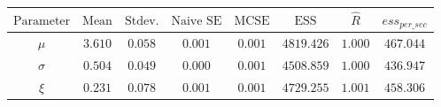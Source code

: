 \begin{tabular}{cccccccc}
\toprule
$\textrm{Parameter}$ & $\textrm{Mean}$ & $\textrm{Stdev.}$ & $\textrm{Naive SE}$ & $\textrm{MCSE}$ & $\textrm{ESS}$ & $\hat{R}$ & $ess_{per\_sec}$\\
\midrule
$\mu$ & $3.610$ & $0.058$ & $0.001$ & $0.001$ & $4819.426$ & $1.000$ & $467.044$\\
$\sigma$ & $0.504$ & $0.049$ & $0.000$ & $0.001$ & $4508.859$ & $1.000$ & $436.947$\\
$\xi$ & $0.231$ & $0.078$ & $0.001$ & $0.001$ & $4729.255$ & $1.001$ & $458.306$\\
\bottomrule
\end{tabular}
